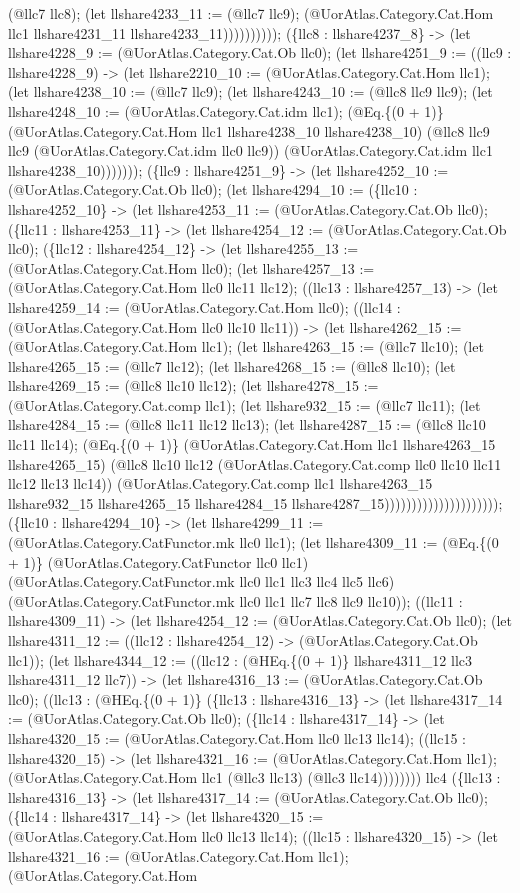 \documentclass[11pt]{article}
\begin{document}
(@llc7 llc8); (let llshare4233\_11 := (@llc7 llc9); (@UorAtlas.Category.Cat.Hom llc1 llshare4231\_11 llshare4233\_11)))))))))); (\{llc8 : llshare4237\_8\} -> (let llshare4228\_9 := (@UorAtlas.Category.Cat.Ob llc0); (let llshare4251\_9 := ((llc9 : llshare4228\_9) -> (let llshare2210\_10 := (@UorAtlas.Category.Cat.Hom llc1); (let llshare4238\_10 := (@llc7 llc9); (let llshare4243\_10 := (@llc8 llc9 llc9); (let llshare4248\_10 := (@UorAtlas.Category.Cat.idm llc1); (@Eq.\{(0 + 1)\} (@UorAtlas.Category.Cat.Hom llc1 llshare4238\_10 llshare4238\_10) (@llc8 llc9 llc9 (@UorAtlas.Category.Cat.idm llc0 llc9)) (@UorAtlas.Category.Cat.idm llc1 llshare4238\_10))))))); (\{llc9 : llshare4251\_9\} -> (let llshare4252\_10 := (@UorAtlas.Category.Cat.Ob llc0); (let llshare4294\_10 := (\{llc10 : llshare4252\_10\} -> (let llshare4253\_11 := (@UorAtlas.Category.Cat.Ob llc0); (\{llc11 : llshare4253\_11\} -> (let llshare4254\_12 := (@UorAtlas.Category.Cat.Ob llc0); (\{llc12 : llshare4254\_12\} -> (let llshare4255\_13 := (@UorAtlas.Category.Cat.Hom llc0); (let llshare4257\_13 := (@UorAtlas.Category.Cat.Hom llc0 llc11 llc12); ((llc13 : llshare4257\_13) -> (let llshare4259\_14 := (@UorAtlas.Category.Cat.Hom llc0); ((llc14 : (@UorAtlas.Category.Cat.Hom llc0 llc10 llc11)) -> (let llshare4262\_15 := (@UorAtlas.Category.Cat.Hom llc1); (let llshare4263\_15 := (@llc7 llc10); (let llshare4265\_15 := (@llc7 llc12); (let llshare4268\_15 := (@llc8 llc10); (let llshare4269\_15 := (@llc8 llc10 llc12); (let llshare4278\_15 := (@UorAtlas.Category.Cat.comp llc1); (let llshare932\_15 := (@llc7 llc11); (let llshare4284\_15 := (@llc8 llc11 llc12 llc13); (let llshare4287\_15 := (@llc8 llc10 llc11 llc14); (@Eq.\{(0 + 1)\} (@UorAtlas.Category.Cat.Hom llc1 llshare4263\_15 llshare4265\_15) (@llc8 llc10 llc12 (@UorAtlas.Category.Cat.comp llc0 llc10 llc11 llc12 llc13 llc14)) (@UorAtlas.Category.Cat.comp llc1 llshare4263\_15 llshare932\_15 llshare4265\_15 llshare4284\_15 llshare4287\_15))))))))))))))))))))); (\{llc10 : llshare4294\_10\} -> (let llshare4299\_11 := (@UorAtlas.Category.CatFunctor.mk llc0 llc1); (let llshare4309\_11 := (@Eq.\{(0 + 1)\} (@UorAtlas.Category.CatFunctor llc0 llc1) (@UorAtlas.Category.CatFunctor.mk llc0 llc1 llc3 llc4 llc5 llc6) (@UorAtlas.Category.CatFunctor.mk llc0 llc1 llc7 llc8 llc9 llc10)); ((llc11 : llshare4309\_11) -> (let llshare4254\_12 := (@UorAtlas.Category.Cat.Ob llc0); (let llshare4311\_12 := ((llc12 : llshare4254\_12) -> (@UorAtlas.Category.Cat.Ob llc1)); (let llshare4344\_12 := ((llc12 : (@HEq.\{(0 + 1)\} llshare4311\_12 llc3 llshare4311\_12 llc7)) -> (let llshare4316\_13 := (@UorAtlas.Category.Cat.Ob llc0); ((llc13 : (@HEq.\{(0 + 1)\} (\{llc13 : llshare4316\_13\} -> (let llshare4317\_14 := (@UorAtlas.Category.Cat.Ob llc0); (\{llc14 : llshare4317\_14\} -> (let llshare4320\_15 := (@UorAtlas.Category.Cat.Hom llc0 llc13 llc14); ((llc15 : llshare4320\_15) -> (let llshare4321\_16 := (@UorAtlas.Category.Cat.Hom llc1); (@UorAtlas.Category.Cat.Hom llc1 (@llc3 llc13) (@llc3 llc14)))))))) llc4 (\{llc13 : llshare4316\_13\} -> (let llshare4317\_14 := (@UorAtlas.Category.Cat.Ob llc0); (\{llc14 : llshare4317\_14\} -> (let llshare4320\_15 := (@UorAtlas.Category.Cat.Hom llc0 llc13 llc14); ((llc15 : llshare4320\_15) -> (let llshare4321\_16 := (@UorAtlas.Category.Cat.Hom llc1); (@UorAtlas.Category.Cat.Hom 
\end{document}
